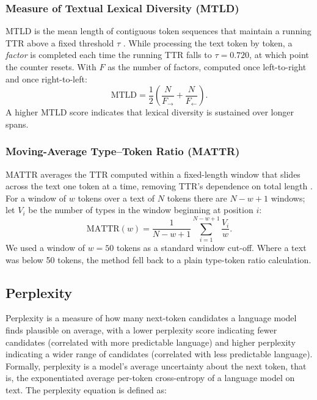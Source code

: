 \documentclass[thesis]{cluu}
\begin{document}
\subsubsection{Measure of Textual Lexical Diversity (MTLD)}
MTLD is the mean length of contiguous token sequences that maintain a running TTR
above a fixed threshold $\tau$ \parencite{mccarthy2010mtld}. While processing the text
token by token, a \emph{factor} is completed each time the running TTR falls to
$\tau = 0.720$, at which point the counter resets. With $F$ as the number of factors, computed once left-to-right and once right-to-left:
\begin{equation}
\mathrm{MTLD} = \frac{1}{2}\left(\frac{N}{F_{\rightarrow}} + \frac{N}{F_{\leftarrow}}\right).
\end{equation}
A higher MTLD score indicates that lexical diversity is sustained over longer spans.

\subsubsection{Moving-Average Type--Token Ratio (MATTR)}
MATTR averages the TTR computed within a fixed-length window that slides across the
text one token at a time, removing TTR's dependence on total length
\parencite{covington2010cutting}. For a window of $w$ tokens over a text of $N$
tokens there are $N-w+1$ windows; let $V_i$ be the number of types in the window
beginning at position $i$:
\begin{equation}
\mathrm{MATTR}(w) = \frac{1}{N-w+1}\sum_{i=1}^{N-w+1}\frac{V_i}{w}.
\end{equation}
We used a window of $w=50$ tokens as a standard window cut-off. Where a text was below 50 tokens, the method fell back to a plain type-token ratio calculation.

\subsection{Perplexity}

Perplexity is a measure of how many next-token candidates a language model finds plausible on average, with a lower perplexity score indicating fewer candidates (correlated with more predictable language) and higher perplexity indicating a wider range of candidates (correlated with less predictable language). Formally, perplexity is a model's average uncertainty about the next token, that is, the exponentiated average per-token cross-entropy of a language model on text. The perplexity equation is defined as:
\end{document}
